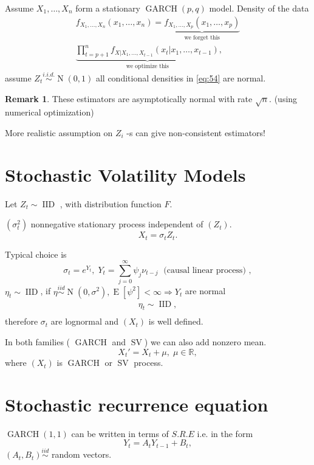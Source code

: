 \documentclass[12pt,a4paper, notitlepage]{book}
\theoremstyle{definition} %
\newtheorem*{remark}{Remark}
\theoremstyle{plain} %
\newcommand{\R}{\mathbb R}
\DeclareMathOperator{\E}{E}
\DeclareMathOperator{\No}{N}
\DeclareMathOperator{\Iid}{IID}
\DeclareMathOperator{\Garch}{GARCH}
\DeclareMathOperator{\Sv}{SV}
\begin{document}
Assume $ X_1, \ldots , X_n $ form a stationary $ \Garch(p,q) $ model. Density of the data
\begin{align*}
 f_{X_1, \ldots, X_n}(x_1, \ldots , x_n) =  \underbrace{ f_{X_1, \ldots , X_p}(x_1, \ldots , x_p)}_{\text{ we forget this }  } \\
\underbrace{\prod_{t=p+1}^n f_{X|X_1, \ldots , X_{t-1}}(x_t | x_1, \ldots , x_{t-1} ) }_{\text{we optimize this}} \label{eq:54} , \end{align*}
assume $ Z_t \overset{i.i.d.}{\sim} \No(0, 1) $ all conditional densities in \ref{eq:54} are
normal.

\begin{remark}
These estimators are asymptotically normal with rate $ \sqrt{n} $. (using numerical optimization)

More realistic assumption on $ Z_i$ -s can give non-consistent estimators!
\end{remark}



\section{ Stochastic Volatility Models}
Let $ Z_t \sim \Iid $ , with distribution function $ F $.

$ (\sigma_t^2) $ nonnegative stationary process independent of $ (Z_t) $.
\[ X_t = \sigma_t Z_t . \]

Typical choice is 
\[
\sigma_t = e^{Y_t} , \; Y_t = \sum_{j=0}^{\infty} \psi _j \nu _{t-j}  \; \text{ (causal linear process) } ,
\]
$ \eta _t \sim \Iid $, if $ \eta \overset{iid}{\sim} \No(0, \sigma^2) , \E[ \psi^2] < \infty \Rightarrow Y_t $ are normal
\begin{align*}
\eta_t \sim \Iid, \\
\end{align*}
therefore $ \sigma_t $ are lognormal and $ (X_t) $ is well defined.

In both families ( $ \Garch $ and $ \Sv $) we can also add
nonzero mean.
\[ X_t' = X_t + \mu, \; \mu \in \R , \]
where $ (X_t) $ is $ \Garch $ or $ \Sv $ process.


\section{Stochastic recurrence equation}

$ \Garch(1,1) $ can be written in terms of $ S.R.E $ i.e. in the form 
\[ Y_t = A_t Y_{t-1} + B_t , \]
$ (A_t, B_t) \overset{iid}{\sim} $ random vectors.
\end{document}
